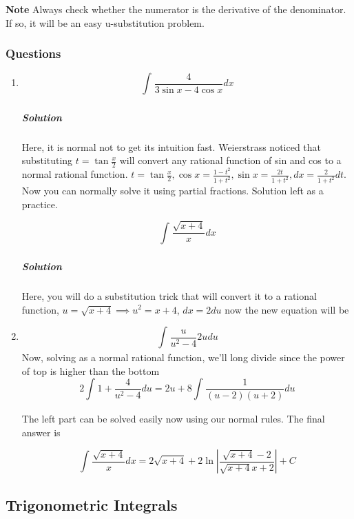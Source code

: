 \documentclass{article}
\begin{document}
	\textbf{Note} Always check whether the numerator is the derivative of the denominator. If so, it will be an easy u-substitution problem. 

	\newpage
	\subsubsection{Questions}

	\begin{enumerate}[1.]
		\item  \[\int^{}_{} \frac{4}{ 3\sin{ x }- 4\cos{ x }  }  dx  \]

			\subparagraph{Solution}
			Here, it is normal not to get its intuition fast. Weierstrass noticed that substituting $ t = \tan{ \frac{x}{2} }  $ will convert any rational function of sin and cos to  a normal rational function. 
			$ t = \tan{ \frac{x}{2} }, \cos{ x } = \frac{ 1-t^2 }{ 1+t^2 }, \sin{ x } = \frac{2t}{1+t^2}, dx = \frac{2}{1+t^2}dt  $. 
			Now you can normally solve it using partial fractions. Solution left as a practice. 

			\[
				\int^{}_{} \frac{\sqrt{x+4}}{x} dx
			\]
			\subparagraph{Solution}
			Here, you will do a substitution trick that will convert it to a rational function, $ u = \sqrt{ x+4 } \implies u^2 = x+4 $, $ dx = 2 du $  now the new equation will be
		\item 	\[ 	\int^{}_{} \frac{u}{u^2-4} 2 u du \]
			Now, solving as a normal rational function, we'll long divide since the power of top is higher than the bottom
			\[
				2\int^{}_{} 1+ \frac{4}{u^2-4} du  = 2u + 8 \int^{}_{} \frac{ 1 }{  (u-2)(u+2)} du  
			\]

			The left part can be solved easily now using our normal rules. The final answer is

			\[
				\int^{}_{} \frac{\sqrt{x+4}}{x} dx = 2 \sqrt{ x+4} +2 \ln | \frac{ \sqrt{ x+4 } -2 }{ \sqrt{ x+4 } x+2 }| + C 
			\]

	\end{enumerate}




	\newpage

	\subsection{Trigonometric Integrals}
\end{document}
